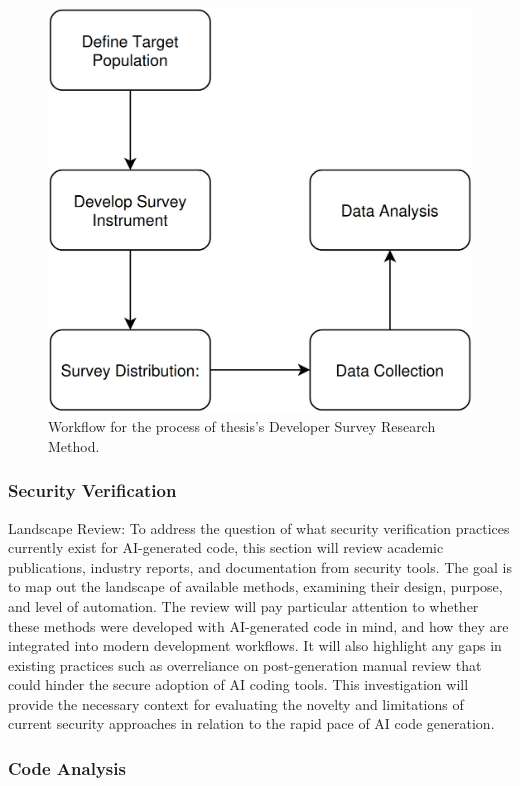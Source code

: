 \begin{figure}[H]
    \centering
    \includegraphics[width=0.9\columnwidth]{assets/survay-workflow.png}
    \caption{Workflow for the process of thesis's Developer Survey Research Method.}
    \label{fig:workflow_diagram}
\end{figure}


\subsubsection{Security Verification}
Landscape Review: To address the question of what security verification practices currently exist for AI-generated code, this section will review academic publications, industry reports, and documentation from security tools. The goal is to map out the landscape of available methods, examining their design, purpose, and level of automation. The review will pay particular attention to whether these methods were developed with AI-generated code in mind, and how they are integrated into modern development workflows. It will also highlight any gaps in existing practices such as overreliance on post-generation manual review that could hinder the secure adoption of AI coding tools. This investigation will provide the necessary context for evaluating the novelty and limitations of current security approaches in relation to the rapid pace of AI code generation.

\subsubsection{Code Analysis}

